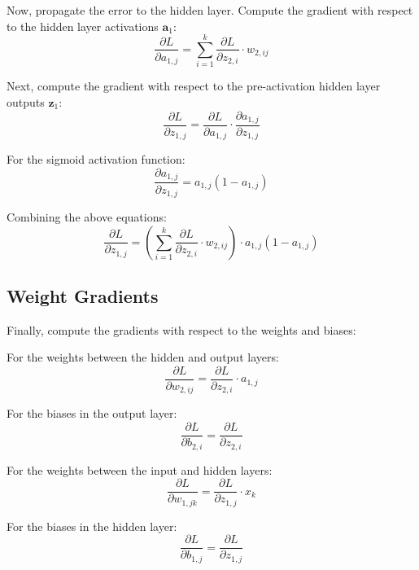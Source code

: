 Now, propagate the error to the hidden layer. Compute the gradient with respect to the hidden layer activations \(\mathbf{a}_{1}\):
\begin{equation}
\frac{\partial L}{\partial a_{1,j}} = \sum_{i=1}^{k} \frac{\partial L}{\partial z_{2,i}} \cdot w_{2,ij}
\end{equation}

Next, compute the gradient with respect to the pre-activation hidden layer outputs \(\mathbf{z}_{1}\):
\begin{equation}
\frac{\partial L}{\partial z_{1,j}} = \frac{\partial L}{\partial a_{1,j}} \cdot \frac{\partial a_{1,j}}{\partial z_{1,j}}
\end{equation}

For the sigmoid activation function:
\begin{equation}
\frac{\partial a_{1,j}}{\partial z_{1,j}} = a_{1,j} (1 - a_{1,j})
\end{equation}

Combining the above equations:
\begin{equation}
\frac{\partial L}{\partial z_{1,j}} = \left(\sum_{i=1}^{k} \frac{\partial L}{\partial z_{2,i}} \cdot w_{2,ij}\right) \cdot a_{1,j} (1 - a_{1,j})
\end{equation}

\subsection{Weight Gradients}

Finally, compute the gradients with respect to the weights and biases:

For the weights between the hidden and output layers:
\begin{equation}
\frac{\partial L}{\partial w_{2,ij}} = \frac{\partial L}{\partial z_{2,i}} \cdot a_{1,j}
\end{equation}

For the biases in the output layer:
\begin{equation}
\frac{\partial L}{\partial b_{2,i}} = \frac{\partial L}{\partial z_{2,i}}
\end{equation}

For the weights between the input and hidden layers:
\begin{equation}
\frac{\partial L}{\partial w_{1,jk}} = \frac{\partial L}{\partial z_{1,j}} \cdot x_{k}
\end{equation}

For the biases in the hidden layer:
\begin{equation}
\frac{\partial L}{\partial b_{1,j}} = \frac{\partial L}{\partial z_{1,j}}
\end{equation}

